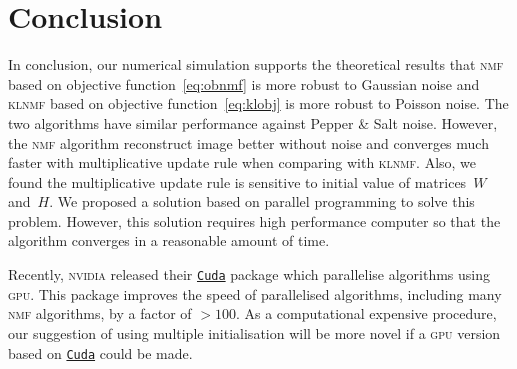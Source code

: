 \section{Conclusion}
In conclusion, our numerical simulation supports the theoretical results that \textsc{nmf} based on objective function~\eqref{eq:obnmf} is more robust to Gaussian noise and \textsc{klnmf} based on objective function~\eqref{eq:klobj} is more robust to Poisson noise. The two algorithms have similar performance against Pepper \& Salt noise. However, the \textsc{nmf} algorithm reconstruct image better without noise and converges much faster with multiplicative update rule when comparing with \textsc{klnmf}. Also, we found the multiplicative update rule is sensitive to initial value of matrices~$W$ and~$H$. We proposed a solution based on parallel programming to solve this problem. However, this solution requires high performance computer so that the algorithm converges in a reasonable amount of time.

Recently, \textsc{nvidia} released their \href{https://developer.nvidia.com/cuda-zone}{\texttt{Cuda}} package which parallelise algorithms using \textsc{gpu}. This package improves the speed of parallelised algorithms, including many \textsc{nmf} algorithms, by a factor of $>100$. As a computational expensive procedure, our suggestion of using multiple initialisation will be more novel if a \textsc{gpu} version based on \href{https://developer.nvidia.com/cuda-zone}{\texttt{Cuda}} could be made. 
